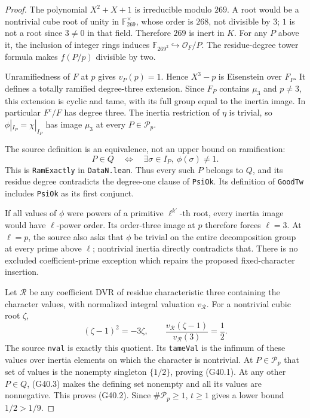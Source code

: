 \begin{proof}
The polynomial $X^2+X+1$ is irreducible modulo $269$.
A root would be a nontrivial cube root of unity in
$\mathbb F_{269}^{\times}$, whose order is $268$,
not divisible by $3$; $1$ is not a root since
$3\ne0$ in that field.  Therefore $269$ is inert
in $K$.  For any $P$ above it, the inclusion of
integer rings induces
$\mathbb F_{269^2}\hookrightarrow\mathcal O_F/P$.
The residue-degree tower formula makes $f(P/p)$
divisible by two.

Unramifiedness of $F$ at $p$ gives $v_P(p)=1$.
Hence $X^3-p$ is Eisenstein over $F_P$.  It defines
a totally ramified degree-three extension.  Since
$F_P$ contains $\mu_3$ and $p\ne3$, this extension
is cyclic and tame, with its full group equal to
the inertia image.  In particular $F^{\mathrm c}/F$
has degree three.  The inertia restriction of $\eta$
is trivial, so $\phi|_{I_P}=\chi|_{I_P}$ has image
$\mu_3$ at every $P\in\mathcal P_p$.

The source definition is an equivalence, not an
upper bound on ramification:
\[
 P\in Q\quad\Longleftrightarrow\quad
        \exists\sigma\in I_P,\ \phi(\sigma)\ne1.
                                                               \tag{G40.3}
\]
This is \texttt{RamExactly} in \texttt{DataN.lean}.
Thus every such $P$ belongs to $Q$, and its residue
degree contradicts the degree-one clause of
\texttt{PsiOk}.  Its definition of \texttt{GoodTw}
includes \texttt{PsiOk} as its first conjunct.

If all values of $\phi$ were powers of a primitive
$\ell^{k'}$-th root, every inertia image would have
$\ell$-power order.  Its order-three image at $p$
therefore forces $\ell=3$.  At $\ell=p$, the source
also asks that $\phi$ be trivial on the entire
decomposition group at every prime above $\ell$;
nontrivial inertia directly contradicts that.
There is no excluded coefficient-prime exception
which repairs the proposed fixed-character insertion.

Let $\mathcal R$ be any coefficient DVR of residue
characteristic three containing the character values,
with normalized integral valuation $v_{\mathcal R}$.
For a nontrivial cubic root $\zeta$,
\[
       (\zeta-1)^2=-3\zeta,\qquad
       \frac{v_{\mathcal R}(\zeta-1)}
            {v_{\mathcal R}(3)}=\frac12.
\]
The source \texttt{nval} is exactly this quotient.
Its \texttt{tameVal} is the infimum of these values
over inertia elements on which the character is
nontrivial.  At $P\in\mathcal P_p$ that set of values
is the nonempty singleton $\{1/2\}$, proving (G40.1).
At any other $P\in Q$, (G40.3) makes the defining
set nonempty and all its values are nonnegative.
This proves (G40.2).  Since $\#\mathcal P_p\geq1$,
$t\geq1$ gives a lower bound $1/2>1/9$.


\end{proof}
